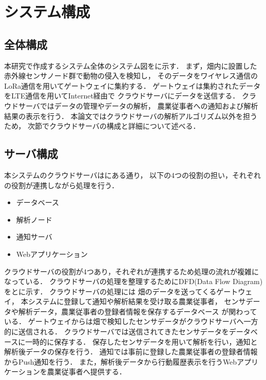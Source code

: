 \documentclass[12pt]{honka_v1}
\begin{document}
\fi
\section{システム構成}
\subsection{全体構成}
本研究で作成するシステム全体のシステム図をに示す．
まず，畑内に設置した赤外線センサノード群で動物の侵入を検知し，
そのデータをワイヤレス通信のLoRa通信を用いてゲートウェイに集約する．
ゲートウェイは集約されたデータをLTE通信を用いてInternet経由で
クラウドサーバにデータを送信する．
クラウドサーバではデータの管理やデータの解析，
農業従事者への通知および解析結果の表示を行う．
本論文ではクラウドサーバの解析アルゴリズム以外を担うため，
次節でクラウドサーバの構成と詳細について述べる．


\subsection{サーバ構成}

本システムのクラウドサーバはにある通り，
以下の4つの役割の担い，それぞれの役割が連携しながら処理を行う．
\begin{itemize}
    \item データベース
    \item 解析ノード
    \item 通知サーバ
    \item Webアプリケーション
\end{itemize}

クラウドサーバの役割が4つあり，それぞれが連携するため処理の流れが複雑になっている．
クラウドサーバの処理を整理するためにDFD(Data Flow Diagram)をとに示す．
クラウドサーバの処理には
畑のデータを送ってくるゲートウェイ，
本システムに登録して通知や解析結果を受け取る農業従事者，
センサデータや解析データ，農業従事者の登録者情報を保存するデータベース
が関わっている．
ゲートウェイからは畑で検知したセンサデータがクラウドサーバへ一方的に送信される．
クラウドサーバでは送信されてきたセンサデータをデータベースに一時的に保存する．
保存したセンサデータを用いて解析を行い，通知と解析後データの保存を行う．
通知では事前に登録した農業従事者の登録者情報からPush通知を行う．
また，解析後データから行動履歴表示を行うWebアプリケーションを農業従事者へ提供する．
\end{document}

